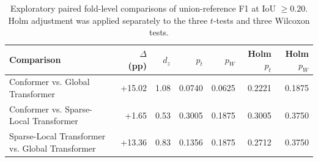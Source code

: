 \begin{table}[!t]
\centering
\caption{Exploratory paired fold-level comparisons of union-reference F1 at IoU $\geq0.20$. Holm adjustment was applied separately to the three $t$-tests and three Wilcoxon tests.}
\label{tab:mass-pairwise-statistics}
\footnotesize
\begin{tabular}{lrrrrrr}
\toprule
Comparison & $\Delta$ (pp) & $d_z$ & $p_t$ & $p_W$ & Holm $p_t$ & Holm $p_W$ \\
\midrule
Conformer vs. Global Transformer & +15.02 & 1.08 & 0.0740 & 0.0625 & 0.2221 & 0.1875 \\
Conformer vs. Sparse-Local Transformer & +1.65 & 0.53 & 0.3005 & 0.1875 & 0.3005 & 0.3750 \\
Sparse-Local Transformer vs. Global Transformer & +13.36 & 0.83 & 0.1356 & 0.1875 & 0.2712 & 0.3750 \\
\bottomrule
\end{tabular}
\end{table}
